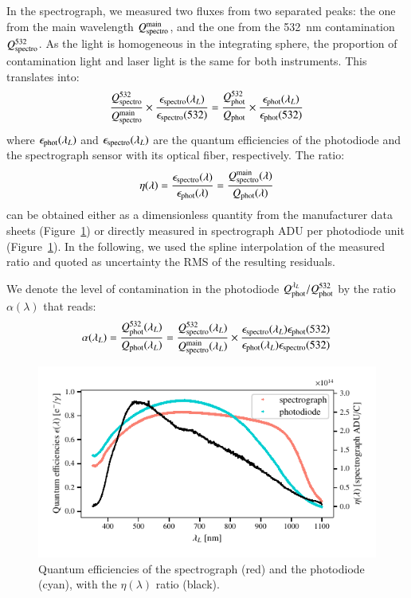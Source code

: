 In the spectrograph, we measured two fluxes from two separated peaks: the one from the main wavelength $Q_{\mathrm{spectro}}^{\mathrm{main}}$, and the one from the \SI{532}{\nm} contamination $Q_{\mathrm{spectro}}^{532}$. As the light is homogeneous in the integrating sphere, the proportion of contamination light and laser light is the same for both instruments. This translates into:
\begin{equation}
    \frac{Q_{\mathrm{spectro}}^{532}}{Q_{\mathrm{spectro}}^{\mathrm{main}}} \times \frac{\epsilon_{\mathrm{spectro}}(\lambda_L)}{\epsilon_{\mathrm{spectro}}(532)} = \frac{Q_{\mathrm{phot}}^{532}}{Q_{\mathrm{phot}}} \times \frac{\epsilon_{\mathrm{phot}}(\lambda_L)}{\epsilon_{\mathrm{phot}}(532)}
    \label{eq:prev_alpha}
\end{equation}
where $\epsilon_{\mathrm{phot}}(\lambda_L)$ and $\epsilon_{\mathrm{spectro}}(\lambda_L)$ are the quantum efficiencies of the photodiode and the spectrograph sensor with its optical fiber, respectively. The ratio:
\begin{equation}\label{eq:eta}
\eta(\lambda) = \frac{\epsilon_{\mathrm{spectro}}(\lambda)}{\epsilon_{\mathrm{phot}}(\lambda)} = \frac{Q_{\mathrm{spectro}}^{\mathrm{main}}(\lambda)}{Q_{\mathrm{phot}}(\lambda)}
\end{equation}
can be obtained either as a dimensionless quantity from the manufacturer data sheets (Figure~\ref{fig:QEs}) or directly measured in spectrograph ADU per photodiode unit (Figure~\ref{fig:QEs}). In the following, we used the spline interpolation of the measured ratio and quoted as uncertainty the RMS of the resulting residuals.


We denote the level of contamination in the photodiode $Q_{\mathrm{phot}}^{\lambda_L}/Q_{\mathrm{phot}}^{532}$ by the ratio $\alpha(\lambda)$ that reads:
\begin{equation}
    \alpha(\lambda_L) = \frac{Q_{\mathrm{phot}}^{532}(\lambda_L)}{Q_{\mathrm{phot}}(\lambda_L)} = \frac{Q_{\mathrm{spectro}}^{532}(\lambda_L)}{Q_{\mathrm{spectro}}^{\mathrm{main}}(\lambda_L)} \times \frac{\epsilon_{\mathrm{spectro}}(\lambda_L)\epsilon_{\mathrm{phot}}(532)}{\epsilon_{\mathrm{phot}}(\lambda_L)\epsilon_{\mathrm{spectro}}(532)} 
    \label{eq:alpha}
\end{equation}

\begin{figure}[h]
    \centering
    \includegraphics[width=\columnwidth]{fig/qe_phototiode_spectro.pdf}
    \caption{Quantum efficiencies of the spectrograph (red) and the photodiode (cyan), with the $\eta(\lambda)$ ratio (black).}
    \label{fig:QEs}
\end{figure}
    
